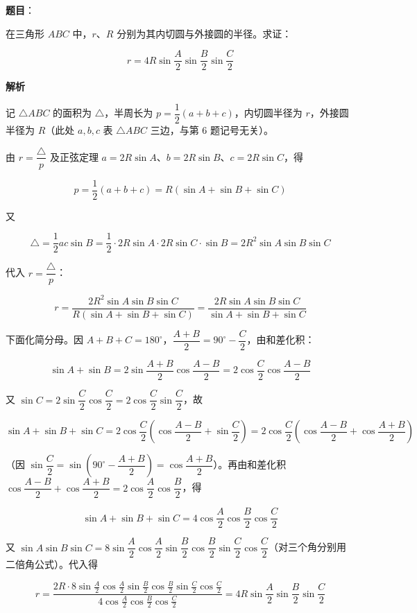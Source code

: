 \begin{answer}

\textbf{题目}：

在三角形 $ABC$ 中，$r$、$R$ 分别为其内切圆与外接圆的半径。求证：

\nopagebreak[4]
\[
r=4R\sin\frac A2\sin\frac B2\sin\frac C2
\]

\textbf{解析}

记 $\triangle ABC$ 的面积为 $\triangle$，半周长为 $p=\dfrac12(a+b+c)$，内切圆半径为 $r$，外接圆半径为 $R$（此处 $a,b,c$ 表 $\triangle ABC$ 三边，与第 6 题记号无关）。

由 $r=\dfrac{\triangle}{p}$ 及正弦定理 $a=2R\sin A$、$b=2R\sin B$、$c=2R\sin C$，得

\nopagebreak[4]
\[
p=\frac12(a+b+c)=R(\sin A+\sin B+\sin C)
\]

又

\nopagebreak[4]
\[
\triangle=\frac12ac\sin B=\frac12\cdot2R\sin A\cdot2R\sin C\cdot\sin B=2R^2\sin A\sin B\sin C
\]

代入 $r=\dfrac{\triangle}{p}$：

\nopagebreak[4]
\[
r=\frac{2R^2\sin A\sin B\sin C}{R(\sin A+\sin B+\sin C)}=\frac{2R\sin A\sin B\sin C}{\sin A+\sin B+\sin C}
\]

下面化简分母。因 $A+B+C=180^\circ$，$\dfrac{A+B}2=90^\circ-\dfrac C2$，由和差化积：

\nopagebreak[4]
\[
\sin A+\sin B=2\sin\frac{A+B}2\cos\frac{A-B}2=2\cos\frac C2\cos\frac{A-B}2
\]

又 $\sin C=2\sin\dfrac C2\cos\dfrac C2=2\cos\dfrac C2\sin\dfrac C2$，故

\nopagebreak[4]
\[
\sin A+\sin B+\sin C=2\cos\frac C2\left(\cos\frac{A-B}2+\sin\frac C2\right)=2\cos\frac C2\left(\cos\frac{A-B}2+\cos\frac{A+B}2\right)
\]

（因 $\sin\dfrac C2=\sin\left(90^\circ-\dfrac{A+B}2\right)=\cos\dfrac{A+B}2$）。再由和差化积 $\cos\dfrac{A-B}2+\cos\dfrac{A+B}2=2\cos\dfrac A2\cos\dfrac B2$，得

\nopagebreak[4]
\[
\sin A+\sin B+\sin C=4\cos\frac A2\cos\frac B2\cos\frac C2
\]

又 $\sin A\sin B\sin C=8\sin\dfrac A2\cos\dfrac A2\sin\dfrac B2\cos\dfrac B2\sin\dfrac C2\cos\dfrac C2$（对三个角分别用二倍角公式）。代入得

\nopagebreak[4]
\[
r=\frac{2R\cdot8\sin\frac A2\cos\frac A2\sin\frac B2\cos\frac B2\sin\frac C2\cos\frac C2}{4\cos\frac A2\cos\frac B2\cos\frac C2}=4R\sin\frac A2\sin\frac B2\sin\frac C2
\]


\end{answer}

